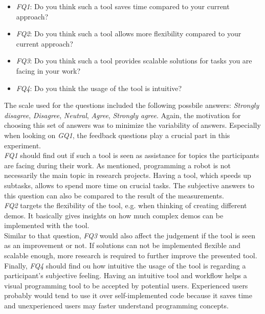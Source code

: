\begin{itemize}
    \item \textit{FQ1}: Do you think such a tool saves time compared to your current approach?
    \item \textit{FQ2}: Do you think such a tool allows more flexibility compared to your current approach?
    \item \textit{FQ3}: Do you think such a tool provides scalable solutions for tasks you are facing in your work?
    \item \textit{FQ4}: Do you think the usage of the tool is intuitive?
\end{itemize}
The scale used for the questions included the following possbile answers: \textit{Strongly disagree}, \textit{Disagree}, \textit{Neutral}, \textit{Agree}, \textit{Strongly agree}. Again, the motivation for choosing this set of answers was to minimize the variability of answers. Especially when looking on \textit{GQ1}, the feedback questions play a crucial part in this experiment. \\

\textit{FQ1} should find out if such a tool is seen as assistance for topics the participants are facing during their work. As mentioned, programming a robot is not necessarily the main topic in research projects. Having a tool, which speeds up subtasks, allows to spend more time on crucial tasks. The subjective answers to this question can also be compared to the result of the measurements. \\

\textit{FQ2} targets the flexibility of the tool, e.g. when thinking of creating different demos. It basically gives insights on how much complex demos can be implemented with the tool. \\

Similar to that question, \textit{FQ3} would also affect the judgement if the tool is seen as an improvement or not. If solutions can not be implemented flexible and scalable enough, more research is required to further improve the presented tool. \\

Finally, \textit{FQ4} should find ou how intuitive the usage of the tool is regarding a participant's subjective feeling. Having an intuitive tool and workflow helps a visual programming tool to be accepted by potential users. Experienced users probably would tend to use it over self-implemented code because it saves time and unexperienced users may faster understand programming concepts.

